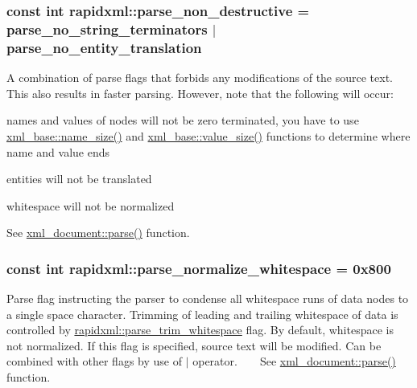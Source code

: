\subsubsection[{parse\+\_\+non\+\_\+destructive}]{\setlength{\rightskip}{0pt plus 5cm}const int rapidxml\+::parse\+\_\+non\+\_\+destructive = {\bf parse\+\_\+no\+\_\+string\+\_\+terminators} $\vert$ {\bf parse\+\_\+no\+\_\+entity\+\_\+translation}}\label{namespacerapidxml_a45d4d8fef551beaaba23a83b847fd6a3}
A combination of parse flags that forbids any modifications of the source text. This also results in faster parsing. However, note that the following will occur\+: 
\begin{DoxyItemize}
\item names and values of nodes will not be zero terminated, you have to use \hyperlink{classrapidxml_1_1xml__base_a7e7f98b3d01e1eab8dc1ca69aad9af84}{xml\+\_\+base\+::name\+\_\+size()} and \hyperlink{classrapidxml_1_1xml__base_a9fcf201ed0915ac18dd43b0b5dcfaf32}{xml\+\_\+base\+::value\+\_\+size()} functions to determine where name and value ends 
\item entities will not be translated 
\item whitespace will not be normalized 
\end{DoxyItemize}See \hyperlink{classrapidxml_1_1xml__document_ac6e73ff9ac323bf5a370c38feb03a6b1}{xml\+\_\+document\+::parse()} function. \hypertarget{namespacerapidxml_a31f33885defb5176a7d99e524c35d386}{}
\subsubsection[{parse\+\_\+normalize\+\_\+whitespace}]{\setlength{\rightskip}{0pt plus 5cm}const int rapidxml\+::parse\+\_\+normalize\+\_\+whitespace = 0x800}\label{namespacerapidxml_a31f33885defb5176a7d99e524c35d386}
Parse flag instructing the parser to condense all whitespace runs of data nodes to a single space character. Trimming of leading and trailing whitespace of data is controlled by \hyperlink{namespacerapidxml_a61912424b47db5038e726d4e1c22417f}{rapidxml\+::parse\+\_\+trim\+\_\+whitespace} flag. By default, whitespace is not normalized. If this flag is specified, source text will be modified. Can be combined with other flags by use of $\vert$ operator. ~\newline
~\newline
 See \hyperlink{classrapidxml_1_1xml__document_ac6e73ff9ac323bf5a370c38feb03a6b1}{xml\+\_\+document\+::parse()} function. \hypertarget{namespacerapidxml_a03fe68fcf5d28f38476e0fd31adecc4c}{}
